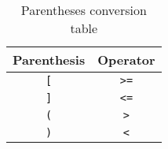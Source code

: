 \begin{table}[!h]
    \begin{center}
        \begin{tabular}{c c}
            \hline
            \textbf{Parenthesis} & \textbf{Operator} \\ \hline
            \verb|[| & \verb|>=| \\
            \verb|]| & \verb|<=| \\
            \verb|(| & \verb|>| \\
            \verb|)| & \verb|<| \\ \hline
        \end{tabular}
    \end{center}

    \caption{Parentheses conversion table}
    \label{tab:conversion-table}
\end{table}
